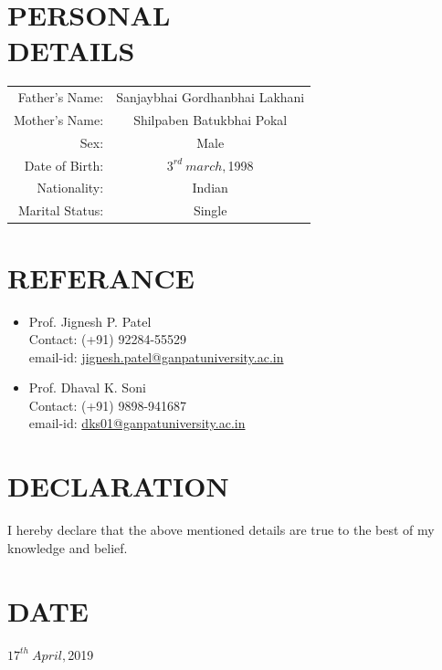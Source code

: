 \documentclass[margin]{res}
\begin{document}
    \section{PERSONAL \\ DETAILS}
    \begin{tabular}{r c}       
        Father's Name: & Sanjaybhai Gordhanbhai Lakhani\\
        Mother's Name: & Shilpaben Batukbhai Pokal\\
        Sex: & Male\\
        Date of Birth: & $3^{rd} \ march, $1998\\
        Nationality: & Indian \\
        Marital Status: & Single \\
    \end{tabular}

    \section{REFERANCE}
    \begin{itemize}
        \item Prof. Jignesh P. Patel\\ 
            Contact: (+91) 92284-55529\\
            email-id: \href{jignesh.patel@ganpatuniversity.ac.in}{jignesh.patel@ganpatuniversity.ac.in}\\
        \item Prof. Dhaval K. Soni\\ 
            Contact: (+91) 9898-941687\\
            email-id: \href{dks01@ganpatuniversity.ac.in}{dks01@ganpatuniversity.ac.in}
    \end{itemize}

    \section{DECLARATION}
    {I hereby declare that the above mentioned details are true to the best of my knowledge and belief.}

    \section{DATE}
    {$17^{th} \ April, $2019}

\(\)
\end{document}
